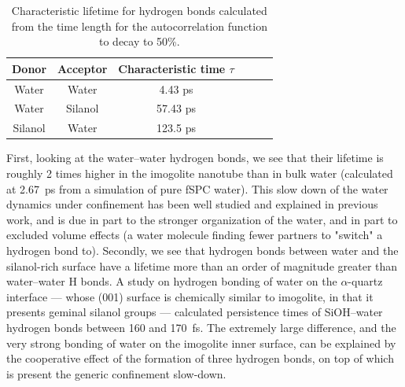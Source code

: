 \documentclass[thesis]{subfiles}
\begin{document}
\begin{table}[t]
\centering
\begin{tabular}{|c|c|c|c|c|c|}
\hline
Donor & Acceptor & Characteristic time $\tau$ \\
\hline
Water & Water & 4.43 ps \\
\hline
Water & Silanol & 57.43 ps\\
\hline
Silanol & Water & 123.5 ps \\
\hline
\end{tabular}
\caption{Characteristic lifetime for hydrogen bonds calculated from the time length for the autocorrelation function to decay to 50\%.}
\label{tab:imogolite:hbonds:lifetime}
\end{table}


First, looking at the water--water hydrogen bonds, we see that their lifetime is
roughly 2 times higher in the imogolite nanotube than in bulk water (calculated
at \SI{2.67}{ps} from a simulation of pure fSPC water). This slow down of the water
dynamics under confinement has been well studied and explained in previous work,
and is due in part to the stronger organization of the water, and in part to
excluded volume effects (a water molecule finding fewer partners to "switch" a
hydrogen bond to)\cite{Fogarty2014, Fogarty2014-2}. Secondly, we
see that hydrogen bonds between water and the silanol-rich surface have a
lifetime more than an order of magnitude greater than water--water H bonds. A
study on hydrogen bonding of water on the $\alpha$-quartz interface --- whose
(001) surface is chemically similar to imogolite, in that it presents geminal
silanol groups --- calculated persistence times of SiOH--water hydrogen bonds
between 160 and \SI{170}{fs}\cite{Ozkanlar2013}. The extremely large
difference, and the very strong bonding of water on the imogolite inner surface,
can be explained by the cooperative effect of the formation of three hydrogen
bonds, on top of which is present the generic confinement slow-down.
\end{document}
